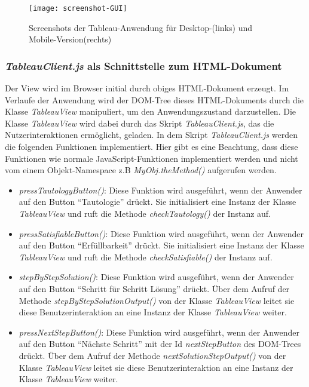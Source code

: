 \begin{figure}[ !h] \centering
\texttt{[image: screenshot-GUI]}
\caption[Screenshots der Tableau-Anwendung]{Screenshots der Tableau-Anwendung für Desktop-(links) und Mobile-Version(rechts)}\label{figs:screenshot-GUI}
\end{figure}

\subsubsection{\textit{TableauClient.js} als Schnittstelle zum HTML-Dokument} \label{subsubsec:TableauClient}
Der View wird im Browser initial durch obiges HTML-Dokument erzeugt. Im Verlaufe der Anwendung wird der DOM-Tree dieses HTML-Dokuments durch die Klasse \textit{TableauView} manipuliert, um den Anwendungszustand darzustellen. Die Klasse \textit{TableauView} wird dabei durch das Skript \textit{TableauClient.js}, das die Nutzerinteraktionen ermöglicht, geladen. In dem  Skript \textit{TableauClient.js} werden die folgenden Funktionen implementiert. Hier gibt es eine Beachtung, dass diese Funktionen wie normale JavaScript-Funktionen implementiert werden und nicht vom einem Objekt-Namespace z.B \textit{MyObj.theMethod()} aufgerufen werden.

\begin{itemize}
\item	\textit{pressTautologyButton()}: Diese Funktion wird ausgeführt, wenn der Anwender auf den Button  ``Tautologie'' drückt. Sie initialisiert  eine Instanz der Klasse \textit{TableauView} und ruft die Methode \textit{checkTautology()} der Instanz auf.
\item \textit{pressSatisfiableButton()}: Diese Funktion wird ausgeführt, wenn der Anwender auf den Button  ``Erfüllbarkeit'' drückt. Sie initialisiert eine Instanz der Klasse \textit{TableauView} und ruft die Methode \textit{checkSatisfiable()} der Instanz auf.
\item	\textit{stepByStepSolution()}: Diese Funktion wird ausgeführt, wenn der Anwender auf den Button  ``Schritt für Schritt Lösung'' drückt. Über dem Aufruf der Methode \textit{stepByStepSolutionOutput()} von der Klasse \textit{TableauView} leitet sie diese  Benutzerinteraktion an eine Instanz der Klasse \textit{TableauView} weiter.
\item	\textit{pressNextStepButton()}: Diese Funktion wird ausgeführt, wenn der Anwender auf den Button  ``Nächste Schritt''  mit der Id \textit{nextStepButton} des DOM-Trees  drückt. Über dem Aufruf der Methode \textit{nextSolutionStepOutput()} von der Klasse \textit{TableauView} leitet sie diese Benutzerinteraktion an eine Instanz der Klasse \textit{TableauView} weiter.
\end{itemize}

